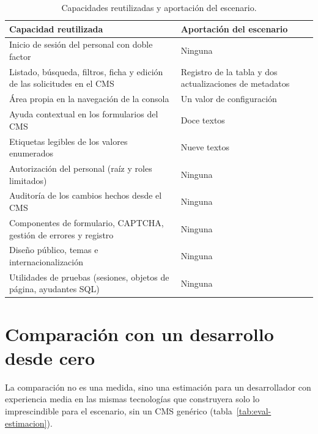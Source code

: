 \begin{table}[htbp]
  \centering
  \footnotesize
  \caption{Capacidades reutilizadas y aportación del escenario.}
  \label{tab:eval-gratis}
  \begin{tabularx}{\textwidth}{@{}X>{\raggedright\arraybackslash}p{5cm}@{}}
    \toprule
    \textbf{Capacidad reutilizada} & \textbf{Aportación del escenario} \\
    \midrule
    Inicio de sesión del personal con doble factor & Ninguna \\
    Listado, búsqueda, filtros, ficha y edición de las solicitudes en el CMS
      & Registro de la tabla y dos actualizaciones de metadatos \\
    Área propia en la navegación de la consola & Un valor de configuración \\
    Ayuda contextual en los formularios del CMS & Doce textos \\
    Etiquetas legibles de los valores enumerados & Nueve textos \\
    Autorización del personal (raíz y roles limitados) & Ninguna \\
    Auditoría de los cambios hechos desde el CMS & Ninguna \\
    Componentes de formulario, CAPTCHA, gestión de errores y registro
      & Ninguna \\
    Diseño público, temas e internacionalización & Ninguna \\
    Utilidades de pruebas (sesiones, objetos de página, ayudantes SQL)
      & Ninguna \\
    \bottomrule
  \end{tabularx}
\end{table}

\section{Comparación con un desarrollo desde cero}
\label{sec:eval-comparacion}

La comparación no es una medida, sino una estimación para un desarrollador
con experiencia media en las mismas tecnologías que construyera solo lo
imprescindible para el escenario, sin un CMS genérico
(tabla~\ref{tab:eval-estimacion}).

